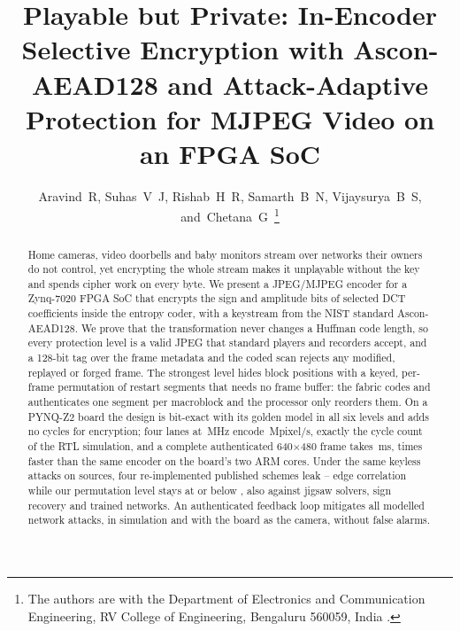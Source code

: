 \documentclass[journal]{IEEEtran}
\theoremstyle{definition}\newtheorem{definition}{Definition}
\begin{document}
\title{Playable but Private: In-Encoder Selective Encryption with Ascon-AEAD128 and Attack-Adaptive Protection for MJPEG Video on an FPGA SoC}
\author{Aravind~R, Suhas~V~J, Rishab~H~R, Samarth~B~N, Vijaysurya~B~S, and~Chetana~G\,%
\thanks{The authors are with the Department of Electronics and Communication Engineering, RV College of Engineering, Bengaluru 560059, India . }}
\maketitle

\begin{abstract}
Home cameras, video doorbells and baby monitors stream over networks their owners do not control, yet encrypting the whole stream makes it unplayable without the key and spends cipher work on every byte. We present a JPEG/MJPEG encoder for a Zynq-7020 FPGA SoC that encrypts the sign and amplitude bits of selected DCT coefficients inside the entropy coder, with a keystream from the NIST standard Ascon-AEAD128. We prove that the transformation never changes a Huffman code length, so every protection level is a valid JPEG that standard players and recorders accept, and a 128-bit tag over the frame metadata and the coded scan rejects any modified, replayed or forged frame. The strongest level hides block positions with a keyed, per-frame permutation of restart segments that needs no frame buffer: the fabric codes and authenticates one segment per macroblock and the processor only reorders them. On a PYNQ-Z2 board the design is bit-exact with its golden model in all six levels and adds no cycles for encryption; four lanes at \BdFourMhz\,MHz encode \BdFourBusyMpix\,Mpixel/s, exactly the cycle count of the RTL simulation, and a complete authenticated 640$\times$480 frame takes \BdFourZcMs\,ms, \BdSpeedupFrame{} times faster than the same encoder on the board's two ARM cores. Under the same keyless attacks on \BenchSources{} sources, four re-implemented published schemes leak \BenchPubMin--\BenchPubMax{} edge correlation while our permutation level stays at or below \BenchEfiveMax{}, also against jigsaw solvers, sign recovery and trained networks. An authenticated feedback loop mitigates all \NumAttacks{} modelled network attacks, in simulation and with the board as the camera, without false alarms.
\end{abstract}
\end{document}
